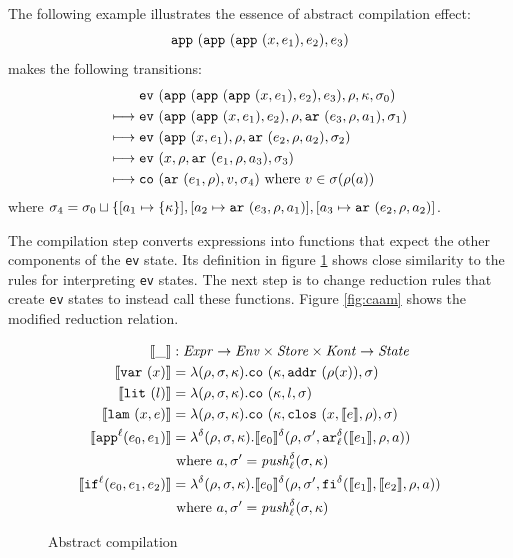 \documentclass[preprint,onecolumn,9pt]{sigplanconf} %
\begin{document}
The following example illustrates
the essence of abstract compilation effect:
\[
\sapp{\sapp{\sapp\mvar{\mexp_1}}{\mexp_2}}{\mexp_3}
\]
makes the following transitions:
\begin{align}
& \ev{\sapp{\sapp{\sapp\mvar{\mexp_1}}{\mexp_2}}{\mexp_3},\menv,\mkont,\msto_0}\\
\machstep\; &
\ev{\sapp{\sapp\mvar{\mexp_1}}{\mexp_2},\menv,\kar{\mexp_3,\menv,\maddr_1},\msto_1}
\\
\machstep\; &
\ev{\sapp\mvar{\mexp_1},\menv,\kar{\mexp_2,\menv,\maddr_2},\msto_2}
\\
\machstep\; &
\ev{\mvar, \menv,\kar{\mexp_1,\menv,\maddr_3},\msto_3} %
\\
\machstep\; &
\co{\kar{\mexp_1,\menv},\mval,\msto_4} %
\mbox{ where } \mval \in \msto(\menv(\maddr))
\end{align}
where \(
\msto_4 = \msto_0 \sqcup \{ [\maddr_1 \mapsto \{ \mkont \}],
[\maddr_2 \mapsto \kar{\mexp_3,\menv,\maddr_1}],
[\maddr_3 \mapsto \kar{\mexp_2,\menv,\maddr_2}]\).


The compilation step converts expressions into functions that expect
the other components of the {\tt ev} state. Its definition in figure
\ref{fig:compile} shows close similarity to the rules for interpreting
    {\tt ev} states. The next step is to change reduction rules that
    create {\tt ev} states to instead call these functions. Figure
    \ref{fig:caam} shows the modified reduction relation.

\begin{figure}
\begin{align*}
\compile{\_} &: \Expr \to \Env \times \Store \times \Kont \to \State \\
\compile{\svar\mvar} &= \lambda(\menv,\msto,\mkont) .\co{\mkont,\saddr{\menv(\mvar)},\msto}
\\
\compile{\slit\mlit} &= \lambda(\menv,\msto,\mkont) .
\co{\mkont,\mlit,\msto}
\\
\compile{\slam\mvar\mexp} &= \lambda(\menv,\msto,\mkont) .
\co{\mkont,\clos{\mvar,\compile\mexp,\menv},\msto}
\\
\compile{\sapp[^\mlab]{\mexpi0}{\mexpi1}} &= \lambda^\mcntr(\menv,\msto,\mkont) .
\compile{\mexpi0}^\mcntr(\menv,\msto',\kar[_\mlab^\mcntr]{\compile{\mexpi1},\menv,\maddr})
\\
&
\text{ where }\maddr,\msto' = \mathit{push}^\mcntr_\mlab(\msto,\mkont)
\\
\compile{\sif[^\mlab]{\mexpi0}{\mexpi1}{\mexpi2}} &= \lambda^\mcntr(\menv,\msto,\mkont) .
\compile{\mexpi0}^\delta(\menv,\msto',\kif[^\mcntr]{\compile{\mexpi1},\compile{\mexpi2},\menv,\maddr})
\\
&\text{ where }\maddr,\msto' = \mathit{push}_\mlab^\mcntr(\msto,\mkont)
\end{align*}
\caption{Abstract compilation}
\label{fig:compile}
\end{figure}
\end{document}
